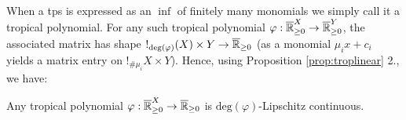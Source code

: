 %


When a tps is expressed as an $\inf$ of finitely many monomials we simply call it a tropical polynomial. 
For any such tropical polynomial $\varphi:\overline{\mathbb{R}}_{\geq 0}^{X}\to \overline{\mathbb{R}}_{\geq 0}^{Y}$, the associated matrix has shape $!_{\mathrm{deg}(\varphi)}(X)\times Y\to \overline{\mathbb{R}}_{\geq 0}$ (as a monomial $\mu_ix+c_{i}$ yields a matrix entry on $!_{\#\mu_i}X\times Y$). Hence, using Proposition \ref{prop:troplinear} 2., we have:
\begin{corollary}\label{prop:polylip}
Any tropical polynomial $\varphi:\overline{\mathbb{R}}_{\geq 0}^{X}\to\overline{\mathbb{R}}_{\geq 0}$ is $\mathrm{deg}(\varphi)$-Lipschitz continuous.
\end{corollary}

